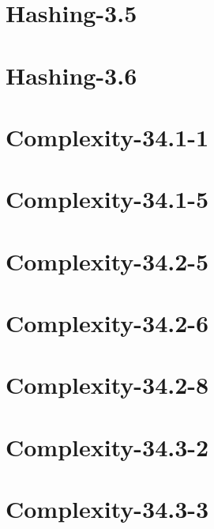\documentclass[12pt]{article}
\begin{document}
\section{Hashing-3.5}

\section{Hashing-3.6}

\section{Complexity-34.1-1}

\section{Complexity-34.1-5}

\section{Complexity-34.2-5}

\section{Complexity-34.2-6}

\section{Complexity-34.2-8}

\section{Complexity-34.3-2}

\section{Complexity-34.3-3}
\end{document}
